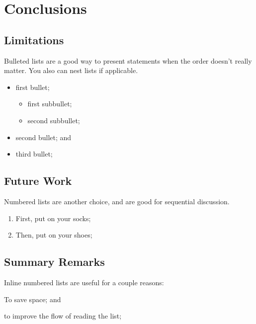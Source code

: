\chapter{Conclusions}
\label{Chapter:Conclusions}

\section{Limitations}
Bulleted lists are a good way to present statements when the order doesn't really matter. You also can nest lists if applicable.

\begin{itemize}
    \item first bullet;
    \begin{itemize}
        \item first subbullet;
        \item second subbullet;
    \end{itemize}
    \item second bullet; and
    \item third bullet;
\end{itemize}

\section{Future Work}
Numbered lists are another choice, and are good for sequential discussion.

\begin{enumerate}
    \item First, put on your socks;
    \item Then, put on your shoes;
\end{enumerate}

\section{Summary Remarks}
Inline numbered lists are useful for a couple reasons: 
\begin{enumerate*}[label=\arabic*)]
    \item To save space; and \item to improve the flow of reading the list;
\end{enumerate*}